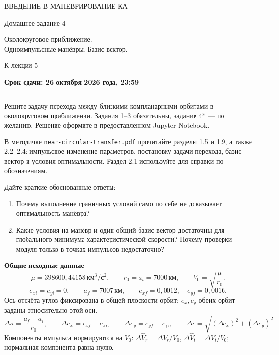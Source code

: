 \documentclass[11pt,a4paper]{article}
\newcommand{\taskheading}[2]{%
  \par\vspace{5pt}{\large\bfseries\color{accent}Задание #1. #2}\par\smallskip}
\begin{document}
{\small\color{accent}ВВЕДЕНИЕ В МАНЕВРИРОВАНИЕ КА}\par
\vspace{3pt}
{\huge Домашнее задание 4}\par
{\large Околокруговое приближение.\\Одноимпульсные манёвры. Базис-вектор.}\par
{\small\color{muted}К лекции 5}
\par{\small\bfseries\color{accent}Срок сдачи: 26 октября 2026 года, 23:59}
\vspace{4pt}
{\color{rulecolor}\hrule}
\vspace{5pt}

Решите задачу перехода между близкими компланарными орбитами
в околокруговом приближении.
Задания 1--3 обязательны, задание 4* --- по желанию.
Решение оформите в предоставленном Jupyter Notebook.

\taskheading{1}{Чтение методички}

В методичке \texttt{near-circular-transfer.pdf} прочитайте разделы
1.5 и 1.9, а также 2.2--2.4: импульсное изменение параметров,
постановку задачи перехода, базис-вектор и условия оптимальности.
Раздел 2.1 используйте для справки по обозначениям.

Дайте краткие обоснованные ответы:
\begin{enumerate}
\item Почему выполнение граничных условий само по себе не доказывает
оптимальность манёвра?
\item Какие условия на манёвр и один общий базис-вектор достаточны
для глобального минимума характеристической скорости? Почему проверки модуля только в точках импульсов
недостаточно?
\end{enumerate}

\begingroup
\setlength{\fboxsep}{9pt}
\colorbox{tint}{\begin{minipage}{\dimexpr\linewidth-2\fboxsep\relax}
\textbf{Общие исходные данные}
\[
 \mu=398600{,}44158\ \text{км}^3/\text{с}^2,\qquad
 r_0=a_i=7000\ \text{км},\qquad V_0=\sqrt{\frac{\mu}{r_0}}.
\]
\[
 e_{xi}=e_{yi}=0,\qquad a_f=7007\ \text{км},\qquad
 e_{xf}=0{,}0012,\quad e_{yf}=0{,}0016.
\]
Ось отсчёта углов фиксирована в общей плоскости орбит;
$e_x,e_y$ обеих орбит заданы относительно этой оси.
\[
 \Delta a=\frac{a_f-a_i}{r_0},\qquad
 \Delta e_x=e_{xf}-e_{xi},\qquad \Delta e_y=e_{yf}-e_{yi},
 \qquad \Delta e=\sqrt{(\Delta e_x)^2+(\Delta e_y)^2}.
\]
Компоненты импульса нормируются на $V_0$:
$\Delta\widehat V_r=\Delta V_r/V_0$,
$\Delta\widehat V_t=\Delta V_t/V_0$; нормальная компонента равна нулю.
\end{minipage}}
\endgroup
\end{document}
